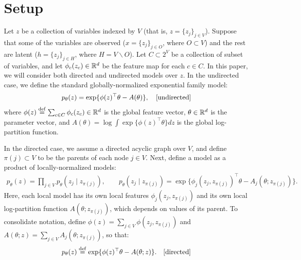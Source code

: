 \section{Setup} \label{sec:setup}

Let $z$ be a collection of variables indexed by $V$ (that is, $z = \{z_j\}_{j \in V}$).
Suppose that some of the variables are observed ($x = \{ z_j \}_{j \in O}$, where $O \subset V$) 
and the rest are latent ($h = \{ z_j \}_{j \in H}$, where $H = V \backslash O$).
Let $C \subset 2^V$ be a collection of subset of variables,
and let $\phi_c(z_c) \in \mathbb{R}^d$ be the feature map for each $c \in C$.
In this paper, we will consider both directed and undirected models over $z$.
In the undirected case, we define the standard globally-normalized exponential family model:
\begin{align}
  p_\theta(z) = \exp\{ \phi(z)^\top\theta - A(\theta) \}, \quad\text{[undirected]}
\end{align}
where $\phi(z) \stackrel{\rm def}{=} \sum_{c \in C} \phi_c(z_c) \in \mathbb{R}^d$ is the global feature vector, $\theta \in \mathbb{R}^d$ is the parameter vector,
and $A(\theta) = \log \int \exp\{\phi(z)^\top\theta\} dz$ is the global log-partition function.

In the directed case, we assume a directed acyclic graph over $V$,
and define $\pi(j) \subset V$ to be the parents of each node $j \in V$.
Next, define a model as a product of locally-normalized models:
\begin{align}
  p_\theta(z) = \prod_{j \in V} p_\theta(z_j \mid z_{\pi(j)}), \quad\quad
  p_\theta(z_j \mid z_{\pi(j)}) = \exp \{ \phi_j(z_j, z_{\pi(j)})^\top\theta - A_j(\theta; z_{\pi(j)}) \}.
\end{align}
Here, each local model has its own local features $\phi_j(z_j, z_{\pi(j)})$
and its own local log-partition function $A(\theta; z_{\pi(j)})$, which depends on values of its parent.
To consolidate notation,
define $\phi(z) = \sum_{j \in V} \phi(z_j, z_{\pi(j)})$
and $A(\theta; z) = \sum_{j \in V} A_j(\theta; z_{\pi(j)})$,
so that:
\begin{align}
  p_\theta(z) \stackrel{\rm def}{=} \exp\{ \phi(z)^\top\theta - A(\theta; z) \}. \quad\text{[directed]}
\end{align}



